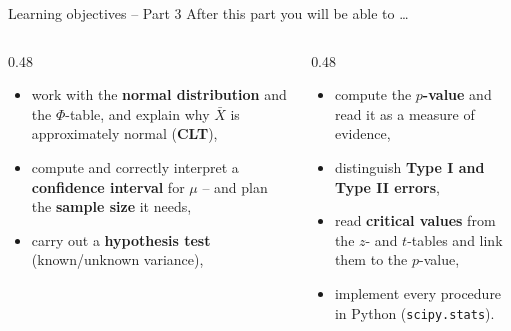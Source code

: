 \documentclass[aspectratio=169,11pt]{beamer}
\begin{document}
\begin{frame}{Learning objectives -- Part 3}
  After this part you will be able to \ldots
  \begin{columns}[T]
    \begin{column}{0.48\textwidth}
      \begin{itemize}\setlength{\itemsep}{0pt}
        \item work with the \textbf{normal distribution} and the
              $\Phi$-table, and explain why $\bar X$ is approximately normal
              (\textbf{CLT}),
        \item compute and correctly interpret a \textbf{confidence interval}
              for $\mu$ -- and plan the \textbf{sample size} it needs,
        \item carry out a \textbf{hypothesis test} (known/unknown
              variance),
      \end{itemize}
    \end{column}
    \begin{column}{0.48\textwidth}
      \begin{itemize}\setlength{\itemsep}{0pt}
        \item compute the \textbf{$p$-value} and read it as a measure of
              evidence,
        \item distinguish \textbf{Type I and Type II errors},
        \item read \textbf{critical values} from the $z$- and $t$-tables and
              link them to the $p$-value,
        \item implement every procedure in Python
              (\texttt{scipy.stats}).
      \end{itemize}
    \end{column}
  \end{columns}
\end{frame}
\end{document}
